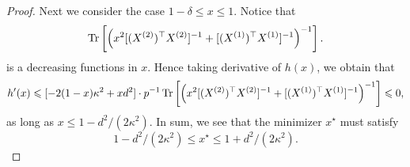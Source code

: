\begin{proof}
Next we consider the case $1-\delta\le x\le 1$. Notice that
$$\operatorname{Tr}\left[\left(x^2[(X^{(2)})^\top X^{(2)}]^{-1} +  [(X^{(1)})^\top X^{(1)}]^{-1}\right)^{-1}\right].$$
is a decreasing functions in $x$. Hence taking derivative of $h(x)$, we obtain that
\begin{align}\label{h'(A)2}
	h'(x)\leqslant [-2(1-x)\kappa^2 + xd^2] \cdot p^{-1} \operatorname{Tr}\left[\left(x^2[(X^{(2)})^\top X^{(2)}]^{-1} + [(X^{(1)})^\top X^{(1)}]^{-1}\right)^{-1}\right]\leqslant 0,
\end{align}
as long as $x\le 1-d^2/(2\kappa^2)$. In sum, we see that the minimizer $x^\star$ must satisfy
$$1-d^2/(2\kappa^2)\le x^\star \le 1+d^2/(2\kappa^2).$$



\end{proof}
